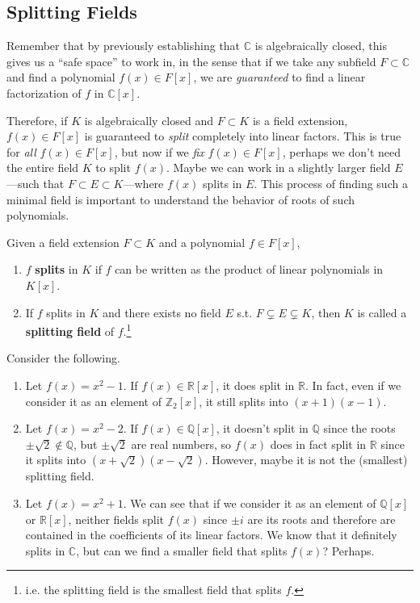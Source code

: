 \subsection{Splitting Fields} 

  Remember that by previously establishing that $\mathbb{C}$ is algebraically closed, this gives us a ``safe space'' to work in, in the sense that if we take any subfield $F \subset \mathbb{C}$ and find a polynomial $f(x) \in F[x]$, we are \textit{guaranteed} to find a linear factorization of $f$ in $\mathbb{C}[x]$. 

  Therefore, if $K$ is algebraically closed and $F \subset K$ is a field extension, $f(x) \in F[x]$ is guaranteed to \textit{split} completely into linear factors. This is true for \textit{all} $f(x) \in F[x]$, but now if we \textit{fix} $f(x) \in F[x]$, perhaps we don't need the entire field $K$ to split $f(x)$. Maybe we can work in a slightly larger field $E$---such that $F \subset E \subset K$---where $f(x)$ splits in $E$. This process of finding such a minimal field is important to understand the behavior of roots of such polynomials. 

  \begin{definition}
    Given a field extension $F \subset K$ and a polynomial $f \in F[x]$, 
    \begin{enumerate}
      \item $f$ \textbf{splits} in $K$ if $f$ can be written as the product of linear polynomials in $K[x]$. 
      \item If $f$ splits in $K$ and there exists no field $E$ s.t. $F \subsetneq E \subsetneq K$, then $K$ is called a \textbf{splitting field} of $f$.\footnote{i.e. the splitting field is the smallest field that splits $f$.} 
    \end{enumerate}
  \end{definition}

  \begin{example}
    Consider the following. 
    \begin{enumerate}
      \item Let $f(x) = x^2 - 1$. If $f(x) \in \mathbb{R}[x]$, it does split in $\mathbb{R}$. In fact, even if we consider it as an element of $\mathbb{Z}_2 [x]$, it still splits into $(x + 1)(x - 1)$. 
      \item Let $f(x) = x^2 - 2$. If $f(x) \in \mathbb{Q}[x]$, it doesn't split in $\mathbb{Q}$ since the roots $\pm \sqrt{2} \not\in \mathbb{Q}$, but $\pm \sqrt{2}$ are real numbers, so $f(x)$ does in fact split in $\mathbb{R}$ since it splits into $(x + \sqrt{2}) (x - \sqrt{2})$. However, maybe it is not the (smallest) splitting field. 
      \item Let $f(x) = x^2 + 1$. We can see that if we consider it as an element of $\mathbb{Q}[x]$ or $\mathbb{R}[x]$, neither fields split $f(x)$ since $\pm i$ are its roots and therefore are contained in the coefficients of its linear factors. We know that it definitely splits in $\mathbb{C}$, but can we find a smaller field that splits $f(x)$? Perhaps.  
    \end{enumerate}
  \end{example}

